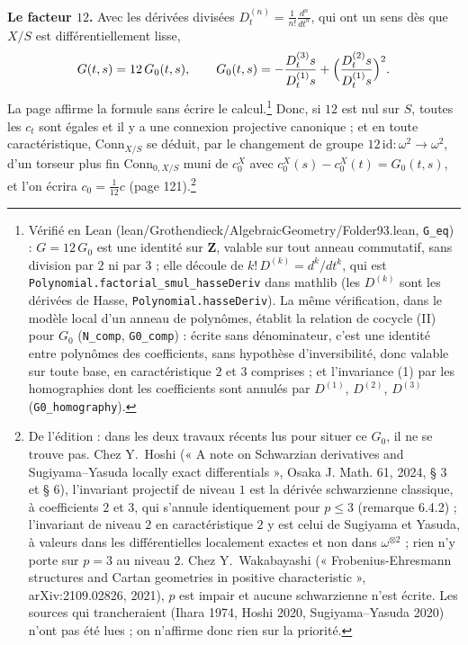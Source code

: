 \documentclass[11pt,a4paper]{article}
\begin{document}
\textbf{Le facteur $12$.} Avec les dérivées divisées $D^{(n)}_t = \frac{1}{n!}
\frac{d^n}{dt^n}$, qui ont un sens dès que $X/S$ est différentiellement lisse,
\[
  G(t,s) = 12\,G_0(t,s), \qquad
  G_0(t,s) = -\frac{D^{(3)}_t s}{D^{(1)}_t s} + \Bigl(\frac{D^{(2)}_t
  s}{D^{(1)}_t s}\Bigr)^2 .
\]
La page affirme la formule sans écrire le calcul.\footnote{Vérifié en Lean
(lean/Grothendieck/AlgebraicGeometry/Folder93.lean, \texttt{G\_eq}) : $G = 12\,G_0$ est une
identité sur $\mathbf{Z}$, valable sur tout anneau commutatif, sans division
par $2$ ni par $3$ ; elle découle de $k!\,D^{(k)} = d^k/dt^k$, qui est
\texttt{Polynomial.factorial\_smul\_hasseDeriv} dans mathlib (les $D^{(k)}$
sont les dérivées de Hasse, \texttt{Polynomial.hasseDeriv}). La même
vérification, dans le modèle local d'un anneau de polynômes, établit la
relation de cocycle (II) pour $G_0$ (\texttt{N\_comp}, \texttt{G0\_comp}) :
écrite sans dénominateur, c'est une identité entre polynômes des
coefficients, sans hypothèse d'inversibilité, donc valable sur toute base, en
caractéristique $2$ et $3$ comprises ; et l'invariance (1) par les
homographies dont les coefficients sont annulés par $D^{(1)}$, $D^{(2)}$,
$D^{(3)}$ (\texttt{G0\_homography}).} Donc, si $12$ est nul sur $S$, toutes les $c_t$ sont égales et il y a une
connexion projective canonique ; et en toute caractéristique,
$\mathrm{Conn}_{X/S}$ se déduit, par le changement de groupe $12\,\mathrm{id} :
\omega^2 \to \omega^2$, d'un torseur plus fin $\mathrm{Conn}_{0,X/S}$ muni de
$c_0^X$ avec $c_0^X(s) - c_0^X(t) = G_0(t,s)$, et l'on écrira $c_0 =
\frac{1}{12}c$ (page 121).\footnote{De l'édition : dans les deux travaux récents
lus pour situer ce $G_0$, il ne se trouve pas. Chez Y.~Hoshi (« A note on
Schwarzian derivatives and Sugiyama--Yasuda locally exact differentials »,
Osaka J. Math. 61, 2024, § 3 et § 6), l'invariant projectif de niveau $1$ est
la dérivée schwarzienne classique, à coefficients $2$ et $3$, qui s'annule
identiquement pour $p \leq 3$ (remarque 6.4.2) ; l'invariant de niveau $2$ en
caractéristique $2$ y est celui de Sugiyama et Yasuda, à valeurs dans les
différentielles localement exactes et non dans $\omega^{\otimes 2}$ ; rien n'y
porte sur $p = 3$ au niveau $2$. Chez Y.~Wakabayashi (« Frobenius-Ehresmann
structures and Cartan geometries in positive characteristic »,
arXiv:2109.02826, 2021), $p$ est impair et aucune schwarzienne n'est écrite.
Les sources qui trancheraient (Ihara 1974, Hoshi 2020, Sugiyama--Yasuda 2020)
n'ont pas été lues ; on n'affirme donc rien sur la priorité.}

\end{document}
